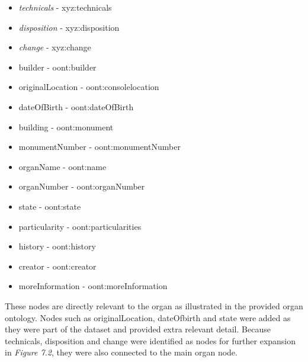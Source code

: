 \vspace{-0.15cm}
\begin{itemize}
    \itemsep0em 
    \item \textit{technicals} - xyz:technicals
    \vspace{-0.1cm}
    \item \textit{disposition} - xyz:disposition
    \vspace{-0.1cm}
    \item \textit{change} - xyz:change
    \vspace{-0.1cm}
    \item builder - oont:builder
    \vspace{-0.1cm}
    \item originalLocation - oont:consolelocation
    \vspace{-0.1cm}
    \item dateOfBirth - oont:dateOfBirth
    \vspace{-0.1cm}
    \item building - oont:monument
    \vspace{-0.1cm}
    \item monumentNumber - oont:monumentNumber
    \vspace{-0.1cm}
    \item organName - oont:name
    \vspace{-0.1cm}
    \item organNumber - oont:organNumber 
    \vspace{-0.1cm}
    \item state - oont:state 
    \vspace{-0.1cm}
    \item particularity - oont:particularities
    \vspace{-0.1cm}
    \item history - oont:history
    \vspace{-0.1cm}
    \item creator - oont:creator
    \vspace{-0.1cm}
    \item moreInformation - oont:moreInformation 
\end{itemize}

These nodes are directly relevant to the organ as illustrated in the provided organ ontology. Nodes such as originalLocation, dateOfbirth and state were added as they were part of the dataset and provided extra relevant detail. Because technicals, disposition and change were identified as nodes for further expansion in \textit{Figure 7.2}, they were also connected to the main organ node. 

